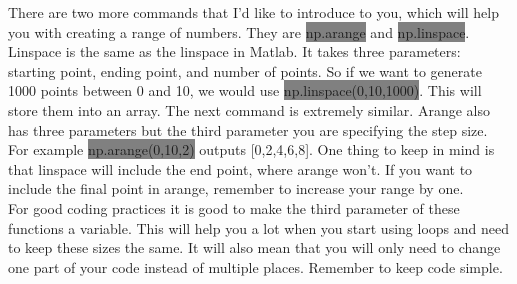 \documentclass[11pt]{article}   %
\newcommand{\gray}[1]{\colorbox{gray}{#1}}
\begin{document}
There are two more commands that I'd like to introduce to you, which will help you with creating a range of numbers.  They are \gray{np.arange} and \gray{np.linspace}.  Linspace is the 
same as the linspace in Matlab.  It takes three parameters: starting point, ending point, and number of points.  So if we want to generate 1000 points between 0 and 10, we would use 
\gray{np.linspace(0,10,1000)}. This will store them into an array.  The next command is extremely similar. Arange also has three parameters but the third parameter you are specifying the
step size.  For example \gray{np.arange(0,10,2)} outputs [0,2,4,6,8].  One thing to keep in mind is that linspace will include the end point, where arange won't.  If you want to include
the final point in arange, remember to increase your range by one.  
\\
For good coding practices it is good to make the third parameter of these functions a variable.  This will help you a lot when you start using loops and need to keep these sizes the same.
It will also mean that you will only need to change one part of your code instead of multiple places.  Remember to keep code simple.  
\end{document}
